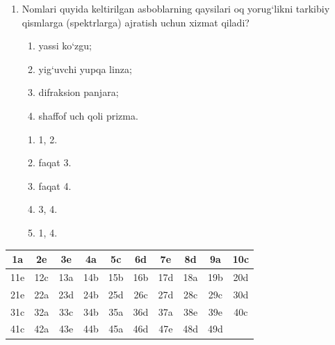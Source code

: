 \begin{enumerate}
\item Nomlari quyida keltirilgan asboblarning qaysilari oq yorug‘likni tarkibiy qismlarga (spektrlarga) ajratish uchun xizmat qiladi?
\begin{enumerate}
\item yassi ko‘zgu;
\item yig‘uvchi yupqa linza;
\item difraksion panjara;
\item shaffof uch qoli prizma.
\end{enumerate}
\begin{enumerate}[label=\Alph*)]
\item 1, 2.
\item faqat 3.
\item faqat 4.
\item 3, 4.
\item 1, 4.
\end{enumerate}


\end{enumerate}




\begin{center}
\begin{tabular}{|c|c|c|c|c|c|c|c|c|c|}
\hline
1a & 2e & 3e & 4a & 5c & 6d & 7e & 8d & 9a & 10c \\ \hline
11e & 12c & 13a & 14b & 15b & 16b & 17d & 18a & 19b & 20d \\ \hline
21e & 22a & 23d & 24b & 25d & 26c & 27d & 28c & 29c & 30d \\ \hline
31c & 32a & 33c & 34b & 35a & 36d & 37a & 38e & 39e & 40c \\ \hline
41c & 42a & 43e & 44b & 45a & 46d & 47e & 48d & 49d & \\ \hline
\end{tabular}
\end{center}